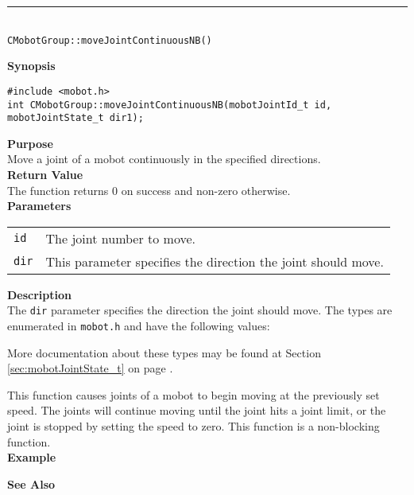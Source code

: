\noindent
\vspace{5pt}
\rule{4.5in}{0.015in}\\
\noindent
{\LARGE \texttt{CMobotGroup::moveJointContinuousNB()}}\\
{}

\noindent
{\bf Synopsis}
\vspace{-8pt}
\begin{verbatim}
#include <mobot.h>
int CMobotGroup::moveJointContinuousNB(mobotJointId_t id, mobotJointState_t dir1);
\end{verbatim}

\noindent
{\bf Purpose}\\
Move a joint of a mobot continuously in the specified directions.\\

\noindent
{\bf Return Value}\\
The function returns 0 on success and non-zero otherwise.\\

\noindent
{\bf Parameters}\\
\vspace{-0.1in}
\begin{description}
\item               
\begin{tabular}{p{10 mm}p{145 mm}}
\texttt{id} & The joint number to move. \\
\texttt{dir} &  
This parameter specifies the direction the joint should move. \\
\end{tabular}
\end{description}

\noindent
{\bf Description}\\
The \texttt{dir} parameter specifies the direction the joint should move.
The types
are enumerated in \texttt{mobot.h} and have the following values:

More documentation about these types may be found at Section
\ref{sec:mobotJointState_t} on page
\pageref{sec:mobotJointState_t}.  

This function causes joints of a mobot to begin moving at the previously set
speed. The joints will continue moving until the joint hits a joint limit, or
the joint is stopped by setting the speed to zero. This function is a non-blocking
function.\\

\noindent
{\bf Example}\\
\noindent

\noindent
{\bf See Also}\\

